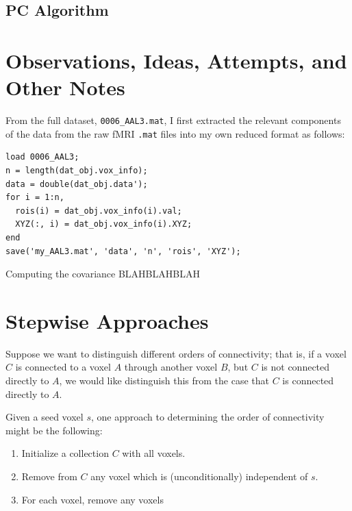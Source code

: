\documentclass[11pt]{article}
\begin{document}
\subsection{PC Algorithm}

\section{Observations, Ideas, Attempts, and Other Notes}
From the full dataset, \texttt{0006\_AAL3.mat}, I first extracted the relevant
components of the data from the raw fMRI \texttt{.mat} files into my own
reduced format as follows:
\begin{verbatim}
load 0006_AAL3;
n = length(dat_obj.vox_info);
data = double(dat_obj.data');
for i = 1:n,
  rois(i) = dat_obj.vox_info(i).val;
  XYZ(:, i) = dat_obj.vox_info(i).XYZ;
end
save('my_AAL3.mat', 'data', 'n', 'rois', 'XYZ');
\end{verbatim}
Computing the covariance BLAHBLAHBLAH

\section{Stepwise Approaches}
Suppose we want to distinguish different orders of connectivity; that is, if
a voxel $C$ is connected to a voxel $A$ through another voxel $B$, but $C$ is
not connected directly to $A$, we would like distinguish this from the case
that $C$ is connected directly to $A$.

Given a seed voxel $s$, one approach to determining the order of connectivity
might be the following:
\begin{enumerate}
\item Initialize a collection $C$ with all voxels.
\item Remove from $C$ any voxel which is (unconditionally) independent of $s$.
\item For each voxel, remove any voxels 
\end{enumerate}
\end{document}
